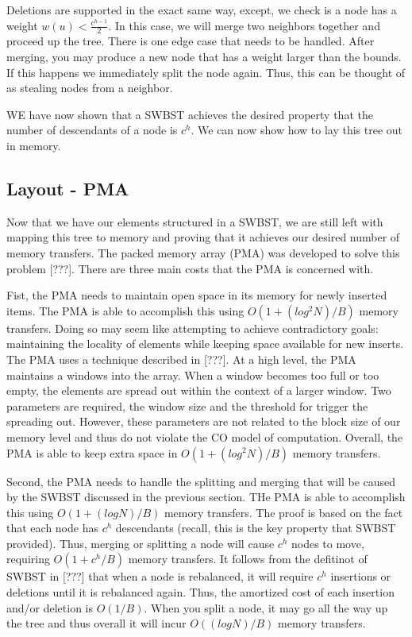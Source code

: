\documentclass{style}
\begin{document}
Deletions are supported in the exact same way, except, we check is a node has
a weight $w(u) < \frac{c^{h-1}}{2}$. In this case, we will merge two neighbors
together and proceed up the tree. There is one edge case that needs to be
handled. After merging, you may produce a new node that has a weight larger
than the bounds. If this happens we immediately split the node again. Thus,
this can be thought of as stealing nodes from a neighbor.

WE have now shown that a SWBST achieves the desired property that the number
of descendants of a node is $c^h$. We can now show how to lay this tree out in
memory.

\subsection{Layout - PMA}
\label{sec:layout}


Now that we have our elements structured in a SWBST, we are still left with
mapping this tree to memory and proving that it achieves our desired number of
memory transfers. The packed memory array (PMA) was developed to solve this
problem [???]. There are three main costs that the PMA is concerned with.

Fist, the PMA needs to maintain open space in its memory for newly inserted
items. The PMA is able to accomplish this using $O(1 + (log^2 N) / B)$ memory
transfers. Doing so may seem like attempting to achieve contradictory goals:
maintaining the locality of elements while keeping space available for new
inserts. The PMA uses a technique described in [???]. At a high level, the PMA
maintains a windows into the array. When a window becomes too full or too
empty, the elements are spread out within the context of a larger window. Two
parameters are required, the window size and the threshold for trigger the
spreading out. However, these parameters are not related to the block size of
our memory level and thus do not violate the CO model of computation. Overall,
the PMA is able to keep extra space in $O(1 + (log^2 N) / B)$ memory
transfers.

Second, the PMA needs to handle the splitting and merging that will be caused
by the SWBST discussed in the previous section. THe PMA is able to accomplish
this using $O(1 + (log N) /B)$ memory transfers. The proof is based on the
fact that each node has $c^h$ descendants (recall, this is the key property
that SWBST provided). Thus, merging or splitting a node will cause $c^h$ nodes
to move, requiring $O(1 + c^h/B)$ memory transfers. It follows from the
defitinot of SWBST in [???] that when a node is rebalanced, it will require
$c^h$ insertions or deletions until it is rebalanced again. Thus, the
amortized cost of each insertion and/or deletion is $O(1/B)$. When you split a
node, it may go all the way up the tree and thus overall it will incur $O((log
N) / B)$ memory transfers.
\end{document}
